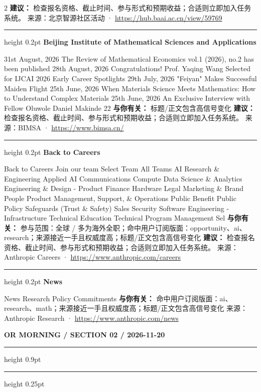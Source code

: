 \documentclass[10.5pt]{ctexart}
\begin{document}
\begin{multicols}{2}
\textbf{建议：} 检查报名资格、截止时间、参与形式和预期收益；合适则立即加入任务系统。
{\footnotesize\color{ormuted} 来源：北京智源社区活动 · \url{https://hub.baai.ac.cn/view/59769}}
\vspace{2mm}
\hrule height 0.2pt
\vspace{2mm}
{\large\bfseries Beijing Institute of Mathematical Sciences and Applications}\par
31st August, 2026 The Review of Mathematical Economics vol.1 (2026), no.2 has been published 28th August, 2026 Congratulations! Prof. Yaqing Wang Selected for IJCAI 2026 Early Career Spotlights 29th July, 2026 "Feiyan" Makes Successful Maiden Flight 25th June, 2026 When Materials Science Meets Mathematics: How to Understand Complex Materials 25th June, 2026 An Exclusive Interview with Fellow Oluwole Daniel Makinde 22
\textbf{与你有关：} 标题/正文包含高信号变化
\textbf{建议：} 检查报名资格、截止时间、参与形式和预期收益；合适则立即加入任务系统。
{\footnotesize\color{ormuted} 来源：BIMSA · \url{https://www.bimsa.cn/}}
\vspace{2mm}
\hrule height 0.2pt
\vspace{2mm}
{\large\bfseries Back to Careers}\par
Back to Careers Join our team Select Team All Teams AI Research \& Engineering Applied AI Communications Compute Data Science \& Analytics Engineering \& Design - Product Finance Hardware Legal Marketing \& Brand People Product Management, Support, \& Operations Public Benefit Public Policy Safeguards (Trust \& Safety) Sales Security Software Engineering - Infrastructure Technical Education Technical Program Management Sel
\textbf{与你有关：} 参与范围：全球 / 多为海外全职；命中用户订阅版面：opportunity、ai、research；来源接近一手且权威度高；标题/正文包含高信号变化
\textbf{建议：} 检查报名资格、截止时间、参与形式和预期收益；合适则立即加入任务系统。
{\footnotesize\color{ormuted} 来源：Anthropic Careers · \url{https://www.anthropic.com/careers}}
\vspace{2mm}
\hrule height 0.2pt
\vspace{2mm}
{\large\bfseries News}\par
News Research Policy Commitments
\textbf{与你有关：} 命中用户订阅版面：ai、research、math；来源接近一手且权威度高；标题/正文包含高信号变化
{\footnotesize\color{ormuted} 来源：Anthropic Research · \url{https://www.anthropic.com/news}}
\end{multicols}
\newpage
{\small\bfseries OR MORNING / SECTION 02 / 2026-11-20}
\vspace{2mm}
\hrule height 0.9pt
\vspace{1.5mm}
\hrule height 0.25pt
\vspace{4mm}
\end{document}
